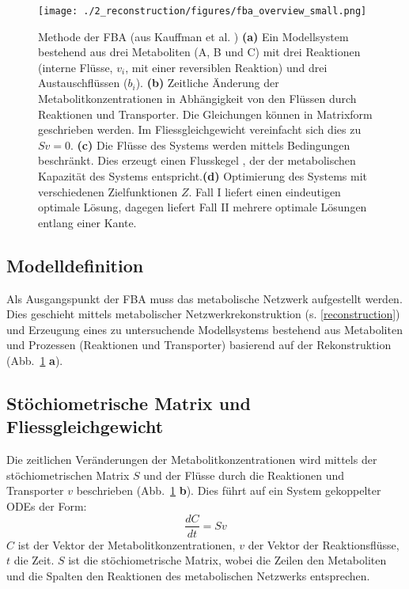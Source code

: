 \begin{figure}[h]
 \centering
 \texttt{[image: ./2\_reconstruction/figures/fba\_overview\_small.png]}
 \caption{Methode der FBA (aus Kauffman et al. \cite{Kauffman2003})
  \textbf{(a)} Ein Modellsystem bestehend aus drei Metaboliten (A, B und C) mit drei Reaktionen (interne Flüsse, $v_i$, mit einer reversiblen Reaktion) und drei Austauschflüssen ($b_i$). \textbf{(b)} Zeitliche Änderung der Metabolitkonzentrationen in Abhängigkeit von den Flüssen durch Reaktionen und Transporter. Die Gleichungen können in Matrixform geschrieben werden. Im Fliessgleichgewicht vereinfacht sich dies zu $S v = 0$. \textbf{(c)} Die Flüsse des Systems werden mittels Bedingungen beschränkt. Dies erzeugt einen Flusskegel \cite{Schilling2000, Papin2002}, der der metabolischen Kapazität des Systems entspricht.\textbf{(d)} Optimierung des Systems mit verschiedenen Zielfunktionen $Z$. Fall I liefert einen eindeutigen optimale Lösung, dagegen liefert Fall II mehrere optimale Lösungen entlang einer Kante.}
 \label{fig: fba_method}
\end{figure}

\subsection{Modelldefinition}
Als Ausgangspunkt der FBA muss das metabolische Netzwerk aufgestellt werden. Dies geschieht mittels metabolischer Netzwerkrekonstruktion (s. \ref{reconstruction}) und Erzeugung eines zu untersuchende Modellsystems bestehend aus Metaboliten und Prozessen (Reaktionen und Transporter) basierend auf der Rekonstruktion (Abb.~\ref{fig: fba_method} \textbf{a}).

\subsection{Stöchiometrische Matrix und Fliessgleichgewicht}
Die zeitlichen Veränderungen der Metabolitkonzentrationen wird mittels der stöchiometrischen Matrix $S$ und der Flüsse durch die Reaktionen und Transporter $v$ beschrieben (Abb.~\ref{fig: fba_method} \textbf{b}). Dies führt auf ein System gekoppelter ODEs der Form:
\begin{equation}
 \frac{dC}{dt} = Sv
\end{equation}
$C$ ist der Vektor der Metabolitkonzentrationen, $v$ der Vektor der Reaktionsflüsse, $t$ die Zeit. $S$ ist die stöchiometrische Matrix, wobei die Zeilen den Metaboliten und die Spalten den Reaktionen des metabolischen Netzwerks entsprechen. 

